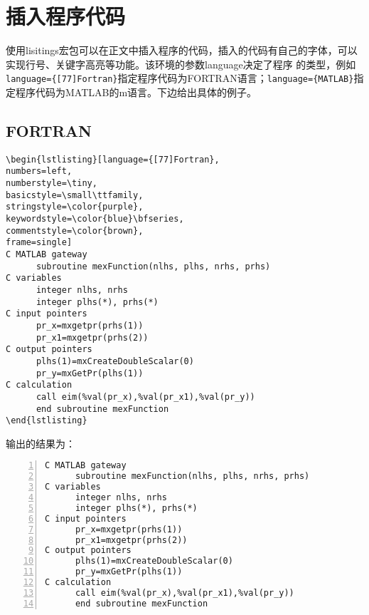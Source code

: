 ﻿%
\chapter{插入程序代码}
\label{chap:chap-5}

使用lisitings宏包可以在正文中插入程序的代码，插入的代码有自己的字体，可以实现行号、关键字高亮等功能。该环境的参数language决定了程序
的类型，例如\verb|language={[77]Fortran}|指定程序代码为FORTRAN语言；\verb|language={MATLAB}|指定程序代码为MATLAB的m语言。下边给出具体的例子。

\section{FORTRAN}
\begin{verbatim}
\begin{lstlisting}[language={[77]Fortran},
numbers=left,
numberstyle=\tiny,
basicstyle=\small\ttfamily,
stringstyle=\color{purple},
keywordstyle=\color{blue}\bfseries,
commentstyle=\color{brown},
frame=single]
C MATLAB gateway
      subroutine mexFunction(nlhs, plhs, nrhs, prhs)
C variables
      integer nlhs, nrhs
      integer plhs(*), prhs(*)
C input pointers
      pr_x=mxgetpr(prhs(1))
      pr_x1=mxgetpr(prhs(2))
C output pointers
      plhs(1)=mxCreateDoubleScalar(0)
      pr_y=mxGetPr(plhs(1))
C calculation
      call eim(%val(pr_x),%val(pr_x1),%val(pr_y))
      end subroutine mexFunction
\end{lstlisting}
\end{verbatim}
输出的结果为：
\begin{lstlisting}[language={[77]Fortran},
numbers=left,
numberstyle=\tiny,
basicstyle=\small\ttfamily,
stringstyle=\color{purple},
keywordstyle=\color{blue}\bfseries,
commentstyle=\color{brown},
frame=single]
C MATLAB gateway
      subroutine mexFunction(nlhs, plhs, nrhs, prhs)
C variables
      integer nlhs, nrhs
      integer plhs(*), prhs(*)
C input pointers
      pr_x=mxgetpr(prhs(1))
      pr_x1=mxgetpr(prhs(2))
C output pointers
      plhs(1)=mxCreateDoubleScalar(0)
      pr_y=mxGetPr(plhs(1))
C calculation
      call eim(%val(pr_x),%val(pr_x1),%val(pr_y))
      end subroutine mexFunction
\end{lstlisting}

